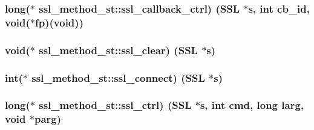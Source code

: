 \subsubsection[{\texorpdfstring{ssl\+\_\+callback\+\_\+ctrl}{ssl_callback_ctrl}}]{\setlength{\rightskip}{0pt plus 5cm}long($\ast$ ssl\+\_\+method\+\_\+st\+::ssl\+\_\+callback\+\_\+ctrl) ({\bf S\+SL} $\ast$s, int cb\+\_\+id, void($\ast${\bf fp})(void))}\hypertarget{structssl__method__st_ac8ad5e3ad9b93cad8439c0af2c280c56}{}\label{structssl__method__st_ac8ad5e3ad9b93cad8439c0af2c280c56}
\subsubsection[{\texorpdfstring{ssl\+\_\+clear}{ssl_clear}}]{\setlength{\rightskip}{0pt plus 5cm}void($\ast$ ssl\+\_\+method\+\_\+st\+::ssl\+\_\+clear) ({\bf S\+SL} $\ast$s)}\hypertarget{structssl__method__st_ae1a1f21bb25134669738357096bfd629}{}\label{structssl__method__st_ae1a1f21bb25134669738357096bfd629}
\subsubsection[{\texorpdfstring{ssl\+\_\+connect}{ssl_connect}}]{\setlength{\rightskip}{0pt plus 5cm}int($\ast$ ssl\+\_\+method\+\_\+st\+::ssl\+\_\+connect) ({\bf S\+SL} $\ast$s)}\hypertarget{structssl__method__st_acfec7986091a9749de81345a3833b595}{}\label{structssl__method__st_acfec7986091a9749de81345a3833b595}
\subsubsection[{\texorpdfstring{ssl\+\_\+ctrl}{ssl_ctrl}}]{\setlength{\rightskip}{0pt plus 5cm}long($\ast$ ssl\+\_\+method\+\_\+st\+::ssl\+\_\+ctrl) ({\bf S\+SL} $\ast$s, int cmd, long larg, void $\ast$parg)}\hypertarget{structssl__method__st_a00f03ff5d9c47885e4cf9340ccb91dd8}{}\label{structssl__method__st_a00f03ff5d9c47885e4cf9340ccb91dd8}
